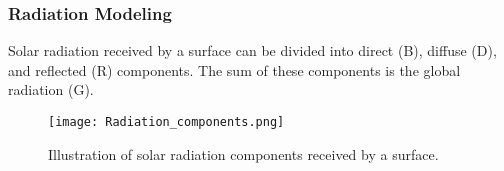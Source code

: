 \begin{frame}
    \frametitle{Radiation Modeling}
    Solar radiation received by a surface can be divided into direct (B), diffuse (D), and reflected (R) components. The sum of these components is the  global radiation (G).
    \vspace*{0.5cm}
    \begin{figure}
        \centering
        \texttt{[image: Radiation\_components.png]}
        \caption{\small Illustration of solar radiation components received by a surface.}
        \label{fig:radiation_components}
    \end{figure}
\end{frame}